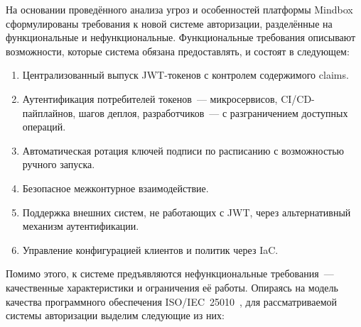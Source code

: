 На основании проведённого анализа угроз и особенностей платформы Mindbox
сформулированы требования к новой системе авторизации,
разделённые на функциональные и нефункциональные.
Функциональные требования описывают возможности, которые система
обязана предоставлять, и состоят в следующем:

\begin{enumerate}
  \item Централизованный выпуск JWT-токенов с контролем содержимого claims.
  \item Аутентификация потребителей токенов~--- микросервисов,
    CI/CD-пайплайнов, шагов деплоя, разработчиков~---
    с разграничением доступных операций.
  \item Автоматическая ротация ключей подписи по расписанию
    с возможностью ручного запуска.
  \item Безопасное межконтурное взаимодействие.
  \item Поддержка внешних систем, не работающих с JWT,
    через альтернативный механизм аутентификации.
  \item Управление конфигурацией клиентов и политик через IaC.
\end{enumerate}

Помимо этого, к системе предъявляются нефункциональные требования~---
качественные характеристики и ограничения её работы.
Опираясь на модель качества программного обеспечения
ISO/IEC~25010~\cite{ISO25010}, для рассматриваемой системы авторизации
выделим следующие из них:

